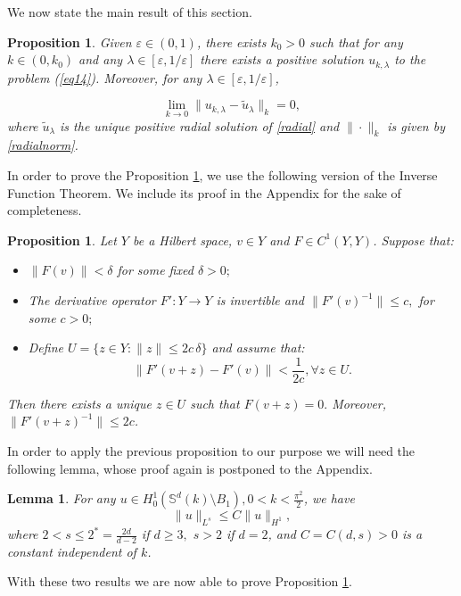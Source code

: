\documentclass[reqno]{amsart}
\newtheorem{lemma}[theorem]{Lemma}
\newtheorem{proposition}[theorem]{Proposition}
\def\e{\varepsilon}
\numberwithin{equation}{section}
\newenvironment{key words}{\textbf{Keywords}\mbox{  }}{ }
\begin{document}
\medskip

We now state the main result of this section.
\begin{proposition} \label{Pr21} Given $\e\in (0,1)$, there exists $k_0>0$ such that for any $k \in (0, k_0)$ and any $\lambda \in [\e, 1/\e]$ there exists a positive solution $u_{k, \lambda}$ to the problem (\ref{eq14}). Moreover, for any $\lambda \in [\e, 1/\e]$,
	
\begin{equation} \label{limitu} \lim_{k \to 0} \| u_{k, \lambda} - \tilde{u}_{\lambda}\|_k =0, \end{equation}
where $\tilde{u}_{\lambda}$ is the unique positive radial solution of \eqref{radial} and $\| \cdot \|_{k}$ is given by \eqref{radialnorm}.
\end{proposition}

In order to prove the Proposition \ref{Pr21}, we use the following version of the Inverse Function Theorem. We include its proof in the Appendix for the sake of completeness.
\begin{proposition} \label{Pr22} Let $Y$ be a Hilbert space, $v\in Y$ and $F\in C^{1}(Y,Y)$. Suppose that:
\begin{itemize}
		\item[(A1)] $\|F(v)\|<\delta$ for some fixed $\delta>0;$
		\item[(A2)] The derivative operator $F':Y\rightarrow Y$ is invertible and $\|F'(v)^{-1}\|\leq c,$ for some $c>0;$
		\item[(A3)] Define $U=\{z\in Y:\|z\|\leq 2 c \, \delta\}$ and assume that:
\[\|F'(v+z)-F'(v)\|<\frac{1}{2 c},\forall z\in U.\]
\end{itemize}
Then there exists a unique $z\in U$ such that $F(v+z)=0.$ Moreover, $\|F'(v+z)^{-1}\| \leq 2c$.
\end{proposition}


In order to apply the previous proposition to our purpose we will need the following lemma, whose proof again is postponed to the Appendix.
\begin{lemma} \label{Le202} For any $u\in H_{0}^{1}(\mathbb{S}^{d}(k)\setminus B_{1}),0<k< \frac{\pi^{2}}{2}$, we have
\[\|u\|_{L^{s}}\leq C\|u\|_{H^{1}},\]
where $2<s\leq2^{\ast}=\frac{2d}{d-2}$ if $d\geq3,$ $s>2$ if $d=2$, and $C=C(d,s)>0$ is a constant independent of $k$.
\end{lemma}

With these two results we are now able to prove Proposition \ref{Pr21}.
\end{document}
